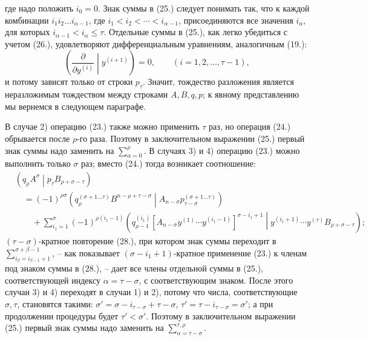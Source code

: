 \documentclass[11pt]{article}
\newcommand{\pair}[2]{\left(#1\middle|#2\right)}
\begin{document}
где надо положить $i_0=0$. Знак суммы в (25.) следует понимать так, что к каждой комбинации $i_1i_2\ldots i_{\alpha-1}$, где $i_1<i_2<\cdots<i_{\alpha-1}$, присоединяются все значения $i_\alpha$, для которых $i_{\alpha-1}<i_\alpha\le\tau$. Отдельные суммы в (25.), как легко убедиться с учетом (26.), удовлетворяют дифференциальным уравнениям, аналогичным (19.):
\begin{equation}
 \left(\frac{\partial}{\partial y^{(i)}}\middle|y^{(i+1)}\right)=0,
 \qquad (i=1,2,\ldots,\tau-1),
\tag{27}
\end{equation}
и потому зависят только от строки $p_\tau$. Значит, тождество разложения является неразложимым тождеством между строками $A,B,q,p$; к явному представлению мы вернемся в следующем параграфе.

В случае 2) операцию (23.) также можно применить $\tau$ раз, но операция (24.) обрывается после $\rho$-го раза. Поэтому в заключительном выражении (25.) первый знак суммы надо заменить на $\sum_{\alpha=0}^{\rho}$. В случаях 3) и 4) операцию (23.) можно выполнить только $\sigma$ раз; вместо (24.) тогда возникает соотношение:
\begin{equation}
\begin{aligned}
&\pair{q_\rho A^\sigma}{p_\tau B_{\rho+\sigma-\tau}}\\
&\quad=(-1)^{\rho\sigma}
\pair{q_\rho^{(\sigma+1\ldots\tau)}B^{n-\rho+\tau-\sigma}}
{A_{n-\sigma}p_{\tau-\sigma}^{(\sigma+1\ldots\tau)}}\\
&\qquad+\sum_{i_1=1}^{\sigma}(-1)^{\rho(i_1-1)}
\pair{q_{\rho-1}^{(i_1)}
[A_{n-\sigma}y^{(1)}\cdots y^{(i_1-1)}]^{\sigma-i_1+1}}
{y^{(i_1+1)}\cdots y^{(\tau)}B_{\rho+\sigma-\tau}};
\end{aligned}
\tag{28}
\end{equation}
$(\tau-\sigma)$-кратное повторение (28.), при котором знак суммы переходит в $\sum_{i_\beta=i_{\beta-1}+1}^{\sigma+\beta-1}$, -- как показывает $(\sigma-i_1+1)$-кратное применение (23.) к членам под знаком суммы в (28.), -- дает все члены отдельной суммы в (25.), соответствующей индексу $\alpha=\tau-\sigma$, с соответствующим знаком. После этого случаи 3) и 4) переходят в случаи 1) и 2), потому что числа, соответствующие $\sigma,\tau$, становятся такими: $\sigma'=\sigma-i_{\tau-\sigma}+\tau-\sigma$, $\tau'=\tau-i_{\tau-\sigma}=\sigma'$; а при продолжении процедуры будет $\tau'<\sigma'$. Поэтому в заключительном выражении (25.) первый знак суммы надо заменить на $\sum_{\alpha=\tau-\sigma}^{\tau,\rho}$.
\end{document}
